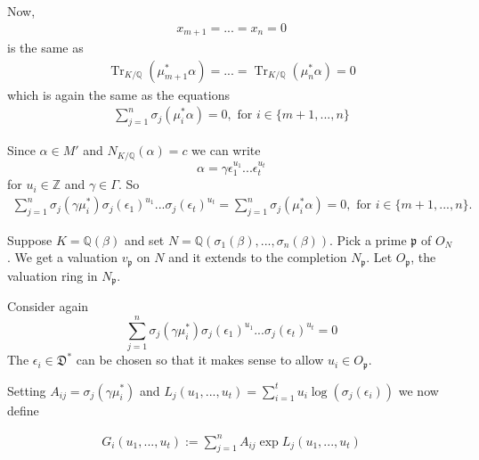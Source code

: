 \documentclass{beamer}
\DeclareMathOperator{\tr}{Tr}
\newcommand{\mfrak}[1]{\mathfrak{#1}}
\newcommand{\mbb}[1]{\mathbb{#1}}
\newcommand{\vp}{{v_{\mfrak p}}}
\numberwithin{equation}{section}
\begin{document}
\begin{frame}
	Now,
	\begin{align*}
		x_{m+1} = ... = x_n = 0
	\end{align*}
	is the same as
	\begin{align*}
		\tr_{K / \mbb Q}(\mu_{m+1}^* \alpha) = ... = \tr_{K / \mbb Q}(\mu_n^* \alpha) = 0
	\end{align*}
	which is again the same as the equations
	\begin{align*}
		\sum_{j=1}^{n} \sigma_j(\mu_i^* \alpha) = 0, \text{ for } i \in \{m+1, ..., n\}
	\end{align*}

\end{frame}

\begin{frame}
	Since $\alpha \in M'$ and $N_{K/\mbb Q}(\alpha) = c$ we can write $$\alpha = \gamma \epsilon_1^{u_1} ... \epsilon_t^{u_t}$$
	for $u_i \in \mbb Z$ and $\gamma \in \Gamma$. So
	\begin{align*}
		\sum_{j=1}^{n} \sigma_j(\gamma \mu_i^*)\sigma_j(\epsilon_1)^{u_1} ... \sigma_j(\epsilon_t)^{u_t}  = \sum_{j=1}^{n} \sigma_j(\mu_i^* \alpha) = 0, \text{ for } i \in \{m+1, ..., n\}.
	\end{align*}
\end{frame}

\begin{frame}
	Suppose $K = \mbb Q(\beta)$ and set $N = \mbb Q(\sigma_1(\beta), ..., \sigma_n(\beta))$. Pick a prime $\mfrak p$ of $O_N$. We get a valuation $\vp$ on $N$ and it extends to the completion $N_\mfrak p$. Let $O_\mfrak p$, the valuation ring in $N_\mfrak p$.
\end{frame}
\begin{frame}
 
	
	Consider again
	$$\sum_{j=1}^{n} \sigma_j(\gamma \mu_i^*)\sigma_j(\epsilon_1)^{u_1} ... \sigma_j(\epsilon_t)^{u_t} = 0$$
	The $\epsilon_i \in \mfrak D^*$ can be chosen so that it makes sense to allow $u_i \in O_\mfrak p$. 

	
	Setting 
	$A_{ij} = \sigma_j(\gamma \mu_i^*)$ and $L_j(u_1, ..., u_t) = \sum_{i=1}^{t} u_i \log(\sigma_j(\epsilon_i))$ we now define

	\begin{align*}
		G_i(u_1, ..., u_t) := \sum_{j = 1}^n A_{ij} \exp L_j(u_1, ..., u_t)
	\end{align*}

\end{frame}
\end{document}
